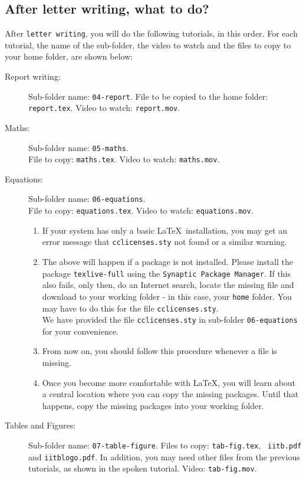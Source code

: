 \documentclass[11pt]{article}
\newenvironment{enumcpt}{\begin{enumerate} \topsep 0pt \partopsep 0pt 
                        \parsep 0pt
                        \itemsep 0pt \leftmargin -1in \rightmargin 0pt
                        }{\end{enumerate}}
\begin{document}
\begin{multicols}{2}
\section{After letter writing, what to do?}
After {\tt letter writing}, you will do the following tutorials, in
this order.  For each tutorial, the name of the sub-folder, the video
to watch and the files to copy to your home folder, are shown below:
\begin{description}
\item [Report writing:]
Sub-folder name: {\tt 04-report}.
File to be copied to the home folder: {\tt report.tex}.  Video to
watch: {\tt report.mov}. 
\item [Maths:]
Sub-folder name: {\tt 05-maths}. \\
File to copy: {\tt maths.tex}.  Video to watch: {\tt maths.mov}.
\item [Equations:]
Sub-folder name: {\tt 06-equations}. \\
File to copy: {\tt equations.tex}.  Video to watch: {\tt equations.mov}.
\begin{enumcpt}
\item If your system has only a basic \LaTeX\ installation, you may
  get an error message that {\tt cclicenses.sty} not found or a
  similar warning.
\item The above will happen if a package is not installed.  Please install the package {\tt texlive-full} using the {\tt Synaptic
    Package Manager}.  If this also fails, only then, do an Internet
  search, locate the missing file and download to your working folder
  - in this case, your {\tt home} folder.  You may have to do this for
  the file {\tt cclicenses.sty}.
\\
We have provided the file {\tt cclicenses.sty} in sub-folder {\tt 06-equations} for your convenience.
\item From now on, you should follow this procedure whenever a file is
  missing.
\item Once you become more comfortable with \LaTeX, you will learn
  about a central location where you can copy the missing packages.
  Until that happens, copy the missing packages into your working
  folder. 
\end{enumcpt}
\item [Tables and Figures:]
Sub-folder name: {\tt 07-table-figure}. 
Files to copy: {\tt tab-fig.tex}, {\tt
  iitb.pdf} and {\tt iitblogo.pdf}.  In addition, you may need other
files from the previous tutorials, as shown in the spoken tutorial.
Video: {\tt tab-fig.mov}.

\end{description}
\end{multicols}
\end{document}
